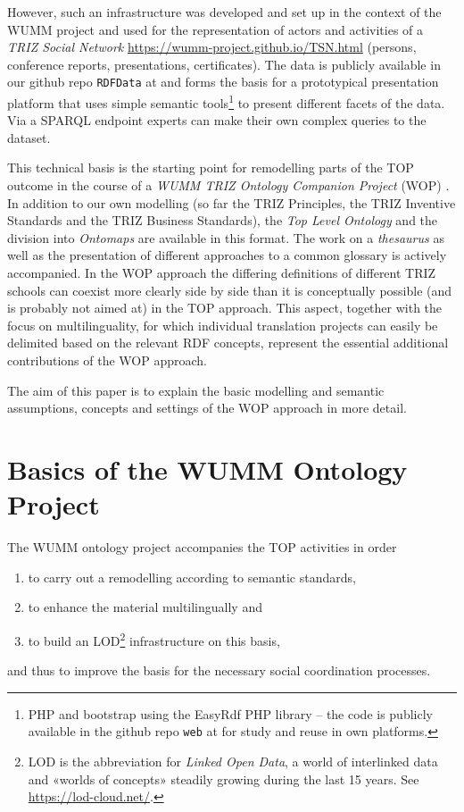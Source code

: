 \documentclass[11pt,a4paper]{article}
\begin{document}
However, such an infrastructure was developed and set up in the context of the
WUMM project \cite{WUMM-pages} and used for the representation of actors and
activities of a \emph{TRIZ Social Network}
\url{https://wumm-project.github.io/TSN.html} (persons, conference reports,
presentations, certificates). The data is publicly available in our github
repo \texttt{RDFData} at \cite{WUMM-github} and forms the basis for a
prototypical presentation platform \cite{WUMM-web} that uses simple semantic
tools\footnote{PHP and bootstrap using the EasyRdf PHP library -- the code is
  publicly available in the github repo \texttt{web} at \cite{WUMM-github} for
  study and reuse in own platforms.} to present different facets of the
data. Via a SPARQL endpoint \cite{WUMM-sparql} experts can make their own
complex queries to the dataset.

This technical basis is the starting point for remodelling parts of the TOP
outcome in the course of a \emph{WUMM TRIZ Ontology Companion Project} (WOP)
\cite{WOP}. In addition to our own modelling (so far the TRIZ Principles, the
TRIZ Inventive Standards and the TRIZ Business Standards), the \emph{Top Level
  Ontology} and the division into \emph{Ontomaps} are available in this
format. The work on a \emph{thesaurus} as well as the presentation of
different approaches to a common glossary is actively accompanied. In the WOP
approach the differing definitions of different TRIZ schools can coexist more
clearly side by side than it is conceptually possible (and is probably not
aimed at) in the TOP approach. This aspect, together with the focus on
multilinguality, for which individual translation projects can easily be
delimited based on the relevant RDF concepts, represent the essential
additional contributions of the WOP approach.

The aim of this paper is to explain the basic modelling and semantic
assumptions, concepts and settings of the WOP approach in more detail. 

\section{Basics of the WUMM Ontology Project}

The WUMM ontology project accompanies the TOP activities in order 
\begin{enumerate}[noitemsep]
\item to carry out a remodelling according to semantic standards,
\item to enhance the material multilingually and
\item to build an LOD\footnote{LOD is the abbreviation for \emph{Linked Open
    Data}, a world of interlinked data and «worlds of concepts» steadily
  growing during the last 15 years. See \url{https://lod-cloud.net/}.  }
  infrastructure on this basis,
\end{enumerate}
and thus to improve the basis for the necessary social coordination processes.
\end{document}
